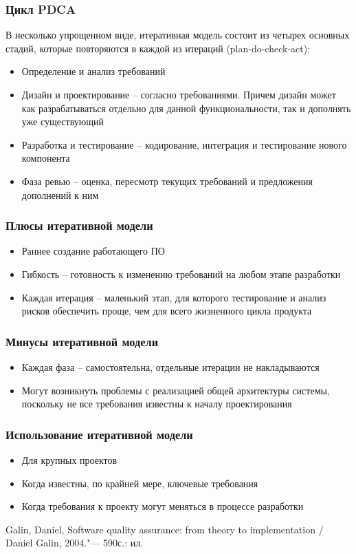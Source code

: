 \documentclass{../industrial-development}
\begin{document}
\begin{frame} \frametitle{Цикл PDCA}
\begin{flushleft}
В несколько упрощенном виде, итеративная модель состоит из четырех основных стадий, которые повторяются в каждой из итераций (plan-do-check-act):
\end{flushleft}
\begin{itemize}
\item Определение и анализ требований
\item Дизайн и проектирование – согласно требованиями. Причем дизайн может как разрабатываться отдельно для данной функциональности, так и дополнять уже существующий
\item Разработка и тестирование – кодирование, интеграция и тестирование нового компонента
\item Фаза ревью – оценка, пересмотр текущих требований и предложения дополнений к ним
\end{itemize}
\end{frame}

\begin{frame} \frametitle{Плюсы итеративной модели}
\begin{itemize}
\item Раннее создание работающего ПО
\item Гибкость – готовность к изменению требований на любом этапе разработки
\item Каждая итерация – маленький этап, для которого тестирование и анализ рисков обеспечить проще, чем для всего жизненного цикла продукта
\end{itemize}
\end{frame}

\begin{frame} \frametitle{Минусы итеративной модели}
\begin{itemize}
\item Каждая фаза – самостоятельна, отдельные итерации не накладываются
\item Могут возникнуть проблемы с реализацией общей архитектуры системы, поскольку не все требования известны к началу проектирования
\end{itemize}
\end{frame}

\begin{frame} \frametitle{Использование итеративной модели}
\begin{itemize}
\item Для крупных проектов
\item Когда известны, по крайней мере, ключевые требования
\item Когда требования к проекту могут меняться в процессе разработки
\end{itemize}
\end{frame}

\begin{thebibliography}{99}
 Galin, Daniel, Software quality assurance: from theory to implementation / Daniel Galin, 2004."--- 590с.: ил.
\end{thebibliography}
\end{document}
